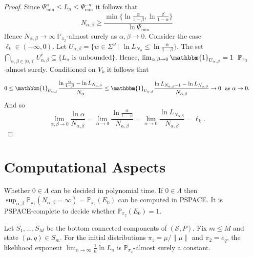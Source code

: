 \documentclass[a4paper,UKenglish,cleveref, autoref,mathscr]{lipics-v2019}
\newcommand{\PP}{\mathbb{P}}
\newcommand{\1}{\mathbbm{1}}
\newcommand{\liexp}{\lim_{n\rightarrow\infty} \frac1n \ln L_n}
\newcommand{\Psimin}{\Psi_{\text{min}}}
\begin{document}
\begin{proof}
Since $\Psimin^n \leq L_n \leq \Psimin^{-n}$ it follows that
\begin{equation*}
N_{\alpha,\beta} \geq \frac{ \min \{ \ln \frac{\alpha}{1 - \beta}, \ln \frac{\beta}{1 - \alpha} \} }{\ln \Psimin}
\end{equation*}
Hence $N_{\alpha, \beta} \rightarrow \infty \ \PP_{\pi_2}$-almost surely as $\alpha, \beta \rightarrow 0$. Consider the case $\ell_k \in (-\infty, 0)$. Let $U_{\alpha,\beta} = \{w \in \Sigma^\omega \mid \ln L_{N_\alpha} \leq \ln \frac{ \alpha}{1 - \beta} \}$. The set $\bigcap_{\alpha, \beta \in (0,1]} U_{\alpha, \beta}^c \subseteq \{L_n \text{ is unbounded}\}$. Hence, $\lim_{\alpha, \beta \rightarrow 0}\1_{U_{\alpha,\beta}} = 1 \ ~\PP_{\pi_2}$-almost surely. Conditioned on $V_k$ it follows that

\begin{equation*}
0 \leq \1_{U_{\alpha, \beta}} \frac{\ln \frac{\alpha}{1 - \beta} - \ln L_{N_{\alpha, \beta}}}{N_\alpha} \leq \1_{U_{\alpha, \beta}}  \frac{\ln L_{N_{\alpha, \beta} - 1}  - \ln L_{N_{\alpha, \beta}}}{N_{\alpha, \beta}}\rightarrow 0 \ \text{ as } \alpha \rightarrow 0.
\end{equation*}
And so 
\begin{equation*}
\lim_{\alpha, \beta \rightarrow 0}\frac{\ln \alpha}{N_{\alpha, \beta}} = \lim_{\alpha \rightarrow 0}\frac{\ln \frac{\alpha}{1-\beta}}{N_{\alpha, \beta}} =\lim_{\alpha \rightarrow 0}\frac{\ln L_{N_{\alpha, \beta}}}{N_{\alpha, \beta}} =\ell_k. 
\end{equation*}
\end{proof}


\section{Computational Aspects}


\begin{proposition}
Whether $0 \in \Lambda$ can be decided in polynomial time. If $0 \in \Lambda$ then $\sup_{\alpha, \beta} \PP_{\pi_2}(N_{\alpha, \beta} = \infty) = \PP_{\pi_2}(E_0)$ can be computed in PSPACE. It is PSPACE-complete to decide whether $\PP_{\pi_2}(E_0) = 1$.
\end{proposition}


\begin{lemma}
Let $S_1, \dots, S_M$ be the bottom connected components of $(\mathcal{S}, P)$. Fix $m \leq M$ and state $(\mu, q) \in S_m$. For the initial distributions $\pi_1 = \mu / \| \mu \|$ and $\pi_2 = e_q$, the likelihood exponent $\liexp$ is $\PP_{\pi_2}$-almost surely a constant. 
\end{lemma}
\end{document}

